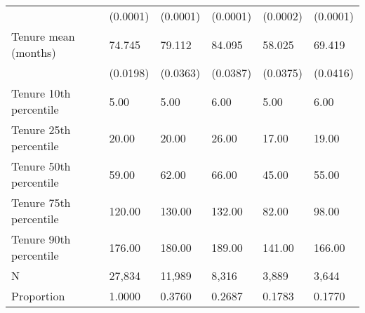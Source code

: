 \begin{tabular}{llllll}
                             &  (0.0001) &  (0.0001) &  (0.0001) &           (0.0002) &         (0.0001) \\
Tenure mean (months)         &    74.745 &    79.112 &    84.095 &             58.025 &           69.419 \\
                             &  (0.0198) &  (0.0363) &  (0.0387) &           (0.0375) &         (0.0416) \\
Tenure 10th percentile       &      5.00 &      5.00 &      6.00 &               5.00 &             6.00 \\
Tenure 25th percentile       &     20.00 &     20.00 &     26.00 &              17.00 &            19.00 \\
Tenure 50th percentile       &     59.00 &     62.00 &     66.00 &              45.00 &            55.00 \\
Tenure 75th percentile       &    120.00 &    130.00 &    132.00 &              82.00 &            98.00 \\
Tenure 90th percentile       &    176.00 &    180.00 &    189.00 &             141.00 &           166.00 \\
N                            &    27,834 &    11,989 &     8,316 &              3,889 &            3,644 \\
Proportion                   &    1.0000 &    0.3760 &    0.2687 &             0.1783 &           0.1770 \\
\bottomrule
\end{tabular}
